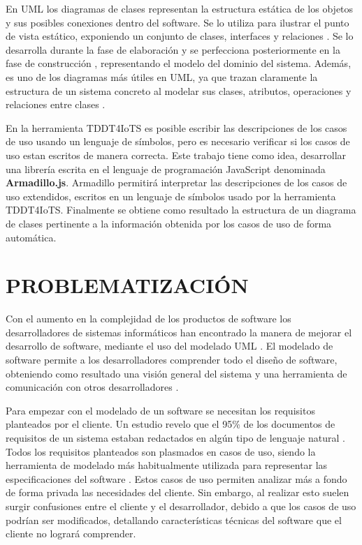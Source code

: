 \documentclass[12pt,a4paper,final, xcolor=table, table]{article}
\begin{document}
	En UML los diagramas de clases representan la estructura estática de los objetos y sus posibles conexiones dentro del software. Se lo utiliza para ilustrar el punto de vista estático, exponiendo un conjunto de clases, interfaces y relaciones \parencite{abu2020}. Se lo desarrolla durante la fase de elaboración y se perfecciona posteriormente en la fase de construcción \parencite{Omg2009}, representando el modelo del dominio del sistema. Además, es uno de los diagramas más útiles en UML, ya que trazan claramente la estructura de un sistema concreto al modelar sus clases, atributos, operaciones y relaciones entre clases \parencite{abu2020}.
	
	En la herramienta TDDT4IoTS \parencite{tddt4iots} es posible escribir las descripciones de los casos de uso usando un lenguaje de símbolos, pero es necesario verificar si los casos de uso estan escritos de manera correcta. Este trabajo tiene como idea, desarrollar una librería escrita en el lenguaje de programación JavaScript denominada \textbf{Armadillo.js}. Armadillo permitirá interpretar las descripciones de los casos de uso extendidos, escritos en un lenguaje de símbolos usado por la herramienta TDDT4IoTS. Finalmente se obtiene como resultado la estructura de un diagrama de clases pertinente a la información obtenida por los casos de uso de forma automática.

	
	\section{PROBLEMATIZACIÓN}
	
	Con el aumento en la complejidad de los productos de software los desarrolladores de sistemas informáticos han encontrado la manera de mejorar el desarrollo de software, mediante el uso del modelado UML \parencite{Jahan2021}. El modelado de software permite a los desarrolladores comprender todo el diseño de software, obteniendo como resultado una visión general del sistema y una herramienta de comunicación con otros desarrolladores \parencite{gonzalez2022}.
	
	Para empezar con el modelado de un software se necesitan los requisitos planteados por el cliente. Un estudio revelo que el 95\% de los documentos de requisitos de un sistema estaban redactados en algún tipo de lenguaje natural \parencite{Jahan2021}. Todos los requisitos planteados son plasmados en casos de uso, siendo la herramienta de modelado más habitualmente utilizada para representar las especificaciones del software \parencite{hamza2021}. Estos casos de uso permiten analizar más a fondo de forma privada las necesidades del cliente. Sin embargo, al realizar esto suelen surgir confusiones entre el cliente y el desarrollador, debido a que los casos de uso podrían ser modificados, detallando características técnicas del software que el cliente no logrará comprender.
	
\end{document}
